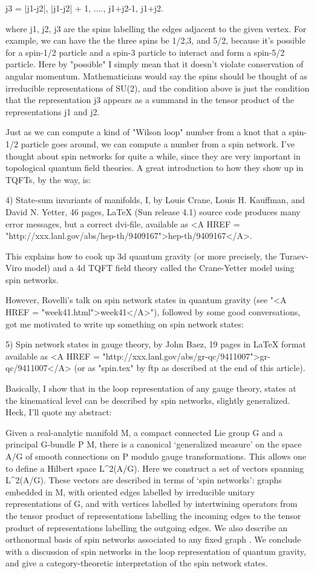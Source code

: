        j3 = |j1-j2|, |j1-j2| + 1, ...., j1+j2-1, j1+j2.

where j1, j2, j3 are the spins labelling the edges adjacent to the given
vertex.  For example, we can have the the three spins be 1/2,3, and 5/2,
because it's possible for a spin-1/2 particle and a spin-3 particle to
interact and form a spin-5/2 particle.  Here by "possible" I simply mean
that it doesn't violate conservation of angular momentum.  Mathematicians
would say the spins should be thought of as irreducible representations
of SU(2), and the condition above is just the condition that the
representation j3 appears as a summand in the tensor product of the
representations j1 and j2.  

Just as we can compute a kind of "Wilson loop" number from a knot that a
spin-1/2 particle goes around, we can compute a number from a spin
network.  I've thought about spin networks for quite a while, since they
are very important in topological quantum field theories.  A great
introduction to how they show up in TQFTs, by the way, is:

4) State-sum invariants of manifolds, I, by Louis Crane, Louis H.
Kauffman, and David N. Yetter, 46 pages, LaTeX (Sun release 4.1) source
code produces many error messages, but a correct dvi-file, available as 
<A HREF = "http://xxx.lanl.gov/abs/hep-th/9409167">hep-th/9409167</A>.  


This explains how to cook up 3d quantum gravity (or more precisely, the
Turaev-Viro model) and a 4d TQFT field theory called the Crane-Yetter
model using spin networks.  

However, Rovelli's talk on spin network states in quantum gravity (see
"<A HREF = "week41.html">week41</A>"), followed by some good conversations, got me motivated to
write up something on spin network states:

5) Spin network states in gauge theory, by John Baez, 19 pages in LaTeX
format available as <A HREF = "http://xxx.lanl.gov/abs/gr-qc/9411007">gr-qc/9411007</A> (or as "spin.tex" by ftp as described
at the end of this article).  


Basically, I show that in the loop representation of any gauge theory,
states at the kinematical level can be described by spin networks,
slightly generalized.  Heck, I'll quote my abstract:

Given a real-analytic manifold M, a compact connected Lie group G and a
principal G-bundle P \to  M, there is a canonical `generalized measure' on
the space A/G of smooth connections on P modulo gauge transformations.
This allows one to define a Hilbert space L^2(A/G).  Here we construct a
set of vectors spanning L^2(A/G).  These vectors are described in terms
of `spin networks': graphs \phi  embedded in M, with oriented edges
labelled by irreducible unitary representations of G, and with vertices
labelled by intertwining operators from the tensor product of
representations labelling the incoming edges to the tensor product of
representations labelling the outgoing edges.  We also describe an
orthonormal basis of spin networks associated to any fixed graph \phi .
We conclude with a discussion of spin networks in the loop
representation of quantum gravity, and give a category-theoretic
interpretation of the spin network states.

